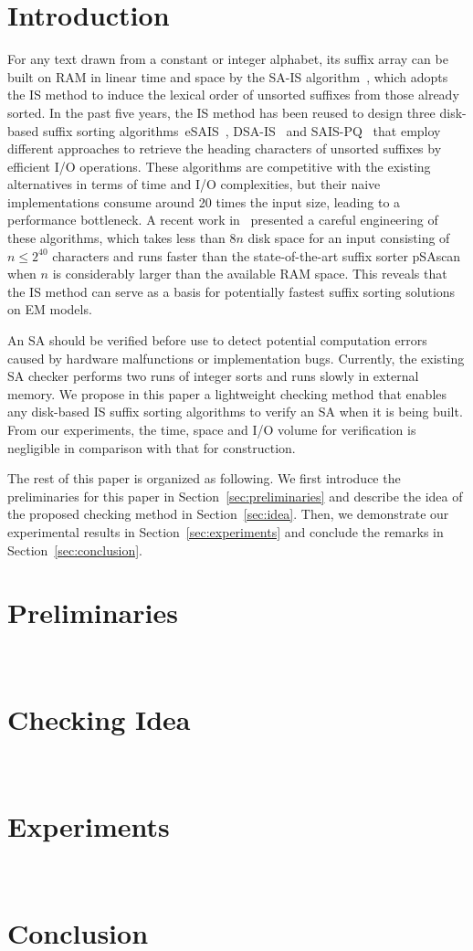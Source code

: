 \documentclass[10pt,journal,compsoc]{IEEEtran}
\begin{document}
\section{Introduction}\label{sec:introduction}

For any text drawn from a constant or integer alphabet, its suffix array can be built on RAM in linear time and space by the SA-IS algorithm~\cite{Nong11}, which adopts the IS method to induce the lexical order of unsorted suffixes from those already sorted. In the past five years, the IS method has been reused to design three disk-based suffix sorting algorithms~eSAIS~\cite{Bingmann12}, DSA-IS~\cite{Nong15} and SAIS-PQ~\cite{Liu15} that employ different approaches to retrieve the heading characters of unsorted suffixes by efficient I/O operations. These algorithms are competitive with the existing alternatives in terms of time and I/O complexities, but their naive implementations consume around 20 times the input size, leading to a performance bottleneck. A	 recent work in~\cite{xxx} presented a careful engineering of these algorithms, which takes less than $8n$ disk space for an input consisting of $n \le 2^{40}$ characters and runs faster than the state-of-the-art suffix sorter pSAscan~\cite{Karkkainen2015} when $n$ is considerably larger than the available RAM space. This reveals that the IS method can serve as a basis for potentially fastest suffix sorting solutions on EM models.

An SA should be verified before use to detect potential computation errors caused by hardware malfunctions or implementation bugs. Currently, the existing SA checker performs two runs of integer sorts and runs slowly in external memory. We propose in this paper a lightweight checking method that enables any disk-based IS suffix sorting algorithms to verify an SA when it is being built. From our experiments, the time, space and I/O volume for verification is negligible in comparison with that for construction.


The rest of this paper is organized as following. We first introduce the preliminaries for this paper in Section~\ref{sec:preliminaries} and describe the idea of the proposed checking method in Section~\ref{sec:idea}. Then, we demonstrate our experimental results in Section~\ref{sec:experiments} and conclude the remarks in Section~\ref{sec:conclusion}. 


\section{Preliminaries}~\label{sec:preliminaries}


\section{Checking Idea}~\label{sec:idea}

\section{Experiments}~\label{sec:experiments}

\section{Conclusion}~\label{sec:conlusion}






\end{document}

